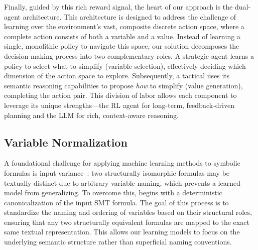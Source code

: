 Finally, guided by this rich reward signal, the heart of our approach is the dual-agent architecture. This architecture is designed to address the challenge of learning over the environment's vast, composite discrete action space, where a complete action consists of both a variable and a value. Instead of learning a single, monolithic policy to navigate this space, our solution decomposes the decision-making process into two complementary roles. A strategic \RL{} agent learns a policy to select what to simplify (variable selection), effectively deciding which dimension of the action space to explore. Subsequently, a tactical \LLM{} uses its semantic reasoning capabilities to propose \textit{how} to simplify (value generation), completing the action pair. This division of labor allows each component to leverage its unique strengths---the RL agent for long-term, feedback-driven planning and the LLM for rich, context-aware reasoning.


\subsection{Variable Normalization}
\label{sec:normalization}

A foundational challenge for applying machine learning methods to symbolic formulas is input variance~\cite{zaheer2017deep,battaglia2018relational}: two structurally isomorphic formulas may be textually distinct due to arbitrary variable naming, which prevents a learned model from generalizing. To overcome this, \tool{} begins with a deterministic canonicalization of the input SMT formula. The goal of this process is to standardize the naming and ordering of variables based on their structural roles, ensuring that any two structurally equivalent formulas are mapped to the exact same textual representation. This allows our learning models to focus on the underlying semantic structure rather than superficial naming conventions.

